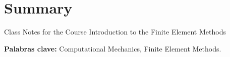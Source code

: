 %

\cleardoublepage {}
{}
\chapter*{Summary}

\vspace{-1cm}

Class Notes for the Course Introduction to the Finite Element Methods


\textbf{Palabras clave: } Computational Mechanics, Finite Element Methods.
